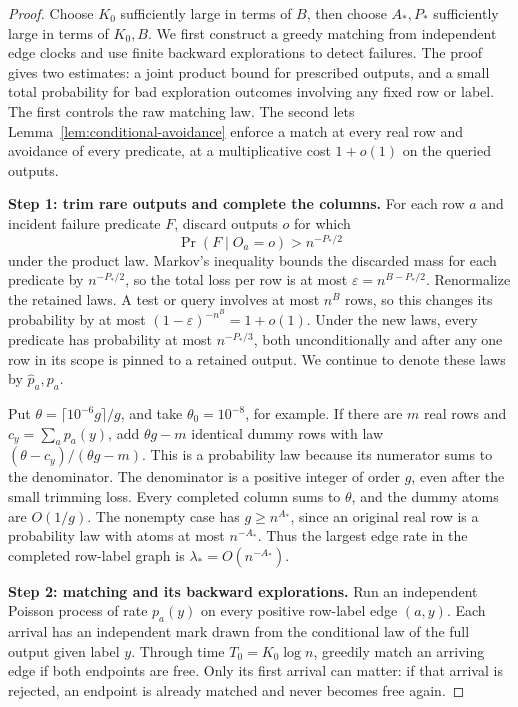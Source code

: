 \begin{proof}
Choose \(K_0\) sufficiently large in terms of \(B\), then choose
\(A_*,P_*\) sufficiently large in terms of \(K_0,B\). We first construct
a greedy matching from independent edge clocks and use finite backward
explorations to detect failures. The proof gives two estimates: a joint
product bound for prescribed outputs, and a small total probability for
bad exploration outcomes involving any fixed row or label. The first
controls the raw matching law. The second lets
Lemma~\ref{lem:conditional-avoidance} enforce a match at every real row
and avoidance of every predicate, at a multiplicative cost \(1+o(1)\)
on the queried outputs.

\noindent\textbf{Step 1: trim rare outputs and complete the columns.}\quad
For each row \(a\) and incident failure predicate \(F\), discard outputs
\(o\) for which
\[
 \Pr(F\mid O_a=o)>n^{-P_*/2}
\]
under the product law. Markov's inequality bounds the discarded mass
for each predicate by \(n^{-P_*/2}\), so the total loss per row is at
most \(\varepsilon=n^{B-P_*/2}\). Renormalize the retained laws. A test
or query involves at most \(n^B\) rows, so this changes its probability
by at most \((1-\varepsilon)^{-n^B}=1+o(1)\). Under the new laws, every
predicate has probability at most \(n^{-P_*/3}\), both unconditionally
and after any one row in its scope is pinned to a retained output. We
continue to denote these laws by \(\widehat p_a,p_a\).

Put \(\theta=\lceil10^{-6}g\rceil/g\), and take
\(\theta_0=10^{-8}\), for example. If there are \(m\) real rows and
\(c_y=\sum_a p_a(y)\), add \(\theta g-m\) identical dummy rows with
law \((\theta-c_y)/(\theta g-m)\). This is a probability law because
its numerator sums to the denominator. The denominator is a positive
integer of order \(g\), even after the small trimming loss. Every
completed column sums to \(\theta\), and the dummy atoms are \(O(1/g)\).
The nonempty case has \(g\ge n^{A_*}\), since an original real row is a
probability law with atoms at most \(n^{-A_*}\). Thus the largest edge
rate in the completed row-label graph is
\(\lambda_*=O(n^{-A_*})\).

\noindent\textbf{Step 2: matching and its backward explorations.}\quad
Run an independent Poisson process of rate \(p_a(y)\) on every positive
row-label edge \((a,y)\). Each arrival has an independent mark drawn
from the conditional law of the full output given label \(y\). Through
time \(T_0=K_0\log n\), greedily match an arriving edge if both endpoints
are free. Only its first arrival can matter: if that arrival is rejected,
an endpoint is already matched and never becomes free again.


\end{proof}
